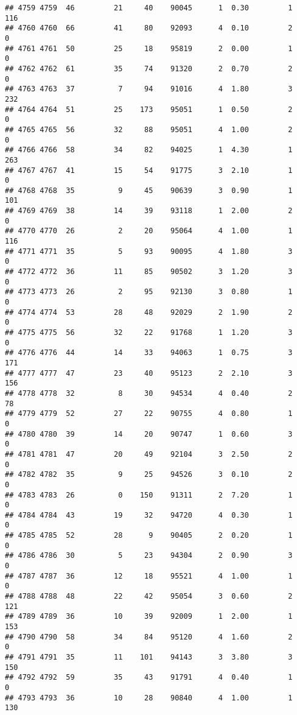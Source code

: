 \documentclass[
]{article}
\begin{document}
\begin{verbatim}
## 4759 4759  46         21     40    90045      1  0.30         1      116
## 4760 4760  66         41     80    92093      4  0.10         2        0
## 4761 4761  50         25     18    95819      2  0.00         1        0
## 4762 4762  61         35     74    91320      2  0.70         2        0
## 4763 4763  37          7     94    91016      4  1.80         3      232
## 4764 4764  51         25    173    95051      1  0.50         2        0
## 4765 4765  56         32     88    95051      4  1.00         2        0
## 4766 4766  58         34     82    94025      1  4.30         1      263
## 4767 4767  41         15     54    91775      3  2.10         1        0
## 4768 4768  35          9     45    90639      3  0.90         1      101
## 4769 4769  38         14     39    93118      1  2.00         2        0
## 4770 4770  26          2     20    95064      4  1.00         1      116
## 4771 4771  35          5     93    90095      4  1.80         3        0
## 4772 4772  36         11     85    90502      3  1.20         3        0
## 4773 4773  26          2     95    92130      3  0.80         1        0
## 4774 4774  53         28     48    92029      2  1.90         2        0
## 4775 4775  56         32     22    91768      1  1.20         3        0
## 4776 4776  44         14     33    94063      1  0.75         3      171
## 4777 4777  47         23     40    95123      2  2.10         3      156
## 4778 4778  32          8     30    94534      4  0.40         2       78
## 4779 4779  52         27     22    90755      4  0.80         1        0
## 4780 4780  39         14     20    90747      1  0.60         3        0
## 4781 4781  47         20     49    92104      3  2.50         2        0
## 4782 4782  35          9     25    94526      3  0.10         2        0
## 4783 4783  26          0    150    91311      2  7.20         1        0
## 4784 4784  43         19     32    94720      4  0.30         1        0
## 4785 4785  52         28      9    90405      2  0.20         1        0
## 4786 4786  30          5     23    94304      2  0.90         3        0
## 4787 4787  36         12     18    95521      4  1.00         1        0
## 4788 4788  48         22     42    95054      3  0.60         2      121
## 4789 4789  36         10     39    92009      1  2.00         1      153
## 4790 4790  58         34     84    95120      4  1.60         2        0
## 4791 4791  35         11    101    94143      3  3.80         3      150
## 4792 4792  59         35     43    91791      4  0.40         1        0
## 4793 4793  36         10     28    90840      4  1.00         1      130

\end{verbatim}
\end{document}

